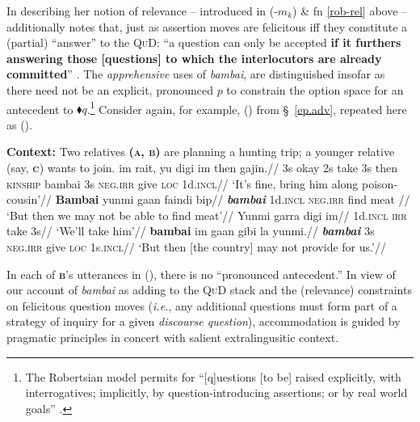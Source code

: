 


In describing her notion of relevance -- introduced in (\lastx-$ m_k $) \& fn \ref{rob-rel} above -- \citeauthor{Roberts2012} additionally notes that, just as assertion moves are felicitous iff they constitute a (partial) ``answer'' to the \textsc{QuD}: ``a question can only be accepted \textbf{if it furthers answering those [questions] to which the interlocutors are already committed}'' \citetext{\citeyear[21]{Roberts2012}, emphasis added}. The \textit{apprehensive} uses of \textit{bambai}, are distinguished insofar as there need not be an explicit, pronounced $ p $ to constrain the option space for an antecedent to $ \blacklozenge q $.\footnote{The Robertsian model permits for ``[q]uestions [to be] raised explicitly, with interrogatives; implicitly, by question-introducing assertions; or by real world goals'' \citep[200]{Simons2017}.\label{adding}}
 Consider again, for example, () from \S~\ref{ep.adv}, repeated here as ().


\pex[everylabel=\bf\sc]\textbf{Context:} Two relatives \textbf{\textsc{(a, b)}} are planning a hunting trip; a younger relative (say, \textsc{\textbf{c}}) wants to join.
\a\begingl\gla im rait, yu digi im then gajin.//
\glb 3s okay 2s take 3s then \textsc{kinship}  bambai 3s \textsc{neg.irr} give \textsc{loc} 1d.\textsc{incl}//
\glft`It's fine, bring him along poison-cousin'//
\endgl
\a\begingl\gla  \textbf{Bambai} yunmi gaan faindi bip//
\glb \textbf{\textit{\textit{bambai}}} 1d\textsc{.incl} \textsc{neg.irr} find meat //
\glft`But then we may not be able to find meat'//
\endgl
\a[label=a]\begingl\gla Yunmi garra digi im//
\glb 1d\textsc{.incl} \textsc{irr} take 3s//
\glft`We'll take him'//
\endgl
\a[label=b]\begingl\gla \textbf{bambai} im gaan gibi la yunmi.//
\glb \textit{\textbf{bambai}} 3s \textsc{neg.irr} give \textsc{loc} 1s\textsc{.incl}//
\glft `But then [the country] may not provide for us.'\trailingcitation{[DW 20170712]}//\endgl
\xe

In each of \textsc{\textbf{b}}'s utterances in (), there is no ``pronounced antecedent.'' In view of our account of \textit{bambai} as adding to the \textsc{QuD} stack and the (relevance) constraints on felicitous question moves (\textit{i.e.}, any additional questions must form part of a strategy of inquiry for a given \textit{discourse question}), accommodation is guided by pragmatic principles in concert with salient extralingusitic context.

